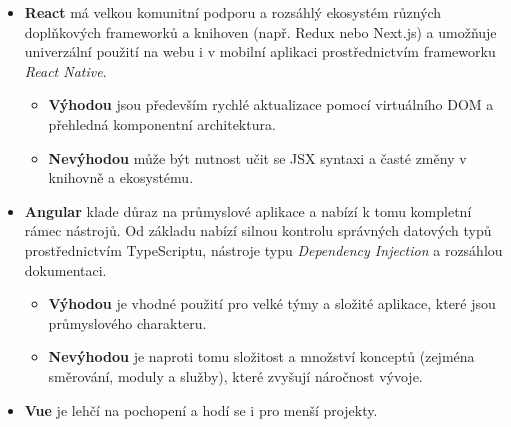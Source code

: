 \begin{itemize}
    \item \textbf{React} má velkou komunitní podporu a rozsáhlý ekosystém
        různých doplňkových frameworků a knihoven (např. Redux nebo Next.js)
        a umožňuje univerzální použití na webu i v mobilní aplikaci
        prostřednictvím frameworku \emph{React Native}.
        
        \begin{itemize}
            \item \textbf{Výhodou} jsou především rychlé aktualizace
                pomocí virtuálního DOM a přehledná komponentní
                architektura. \cite{YHVfLHsNlUItkF6G,1WL9hIh67tHjtVTy}
            \item \textbf{Nevýhodou} může být nutnost učit se JSX syntaxi
                a časté změny v knihovně a ekosystému.
        \end{itemize}
    \item \textbf{Angular} klade důraz na průmyslové aplikace a nabízí
        k tomu kompletní rámec nástrojů. Od základu nabízí silnou kontrolu
        správných datových typů prostřednictvím TypeScriptu, nástroje
        typu \emph{Dependency Injection} a rozsáhlou dokumentaci.
        \cite{YHVfLHsNlUItkF6G,1WL9hIh67tHjtVTy} %

        \begin{itemize}
            \item \textbf{Výhodou} je vhodné použití pro velké týmy
                a složité aplikace, které jsou průmyslového charakteru.
                \cite{YHVfLHsNlUItkF6G,1WL9hIh67tHjtVTy}
            \item \textbf{Nevýhodou} je naproti tomu složitost a množství
                konceptů (zejména směrování, moduly a služby), které
                zvyšují náročnost vývoje.
                \cite{YHVfLHsNlUItkF6G,1WL9hIh67tHjtVTy}
        \end{itemize}
    \item \textbf{Vue} je lehčí na pochopení a hodí se i pro menší projekty.


\end{itemize}
